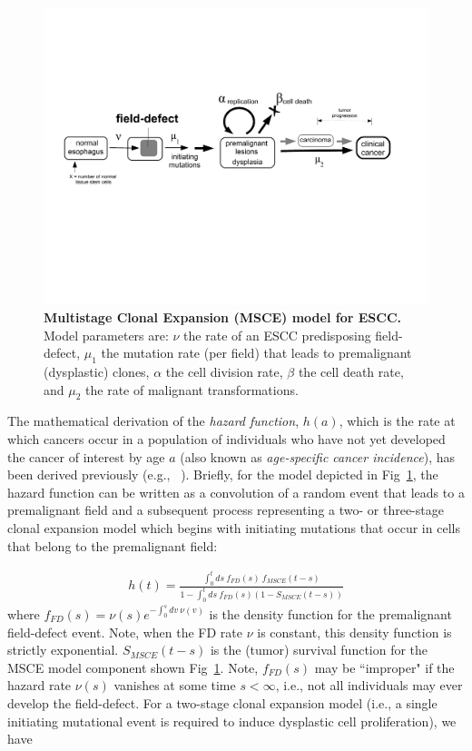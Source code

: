 \documentclass[10pt,letterpaper]{article}
\begin{document}
\medskip
\begin{figure}[!ht]
\begin{adjustwidth}{-1.in}{0in} %
\includegraphics[scale=0.6, trim=0 0 0 0]{FEFF-model-2.pdf}
\caption{{\bf Multistage Clonal Expansion (MSCE) model for ESCC.} Model parameters are: $\nu$ the rate of an ESCC predisposing field-defect, $\mu_1$ the mutation rate (per field) that leads to premalignant (dysplastic) clones, $\alpha$ the cell division rate, $\beta$ the cell death rate, and $\mu_2$ the rate of malignant transformations.}
\label{fig1}
\end{adjustwidth}
\end{figure}

The mathematical derivation of the {\it hazard function}, $h(a)$, which is the rate at which cancers occur in a population of individuals who have not yet developed the cancer of interest by age $a$ (also known as {\it age-specific cancer incidence}), has been derived previously (e.g., ~\cite{Jeon2006}). Briefly, for the model depicted in Fig~\ref{fig1}, the hazard function can be written as a convolution of a random event that leads to a premalignant field and a subsequent process representing a two- or three-stage clonal expansion model which begins with initiating mutations that occur in cells that belong to the premalignant field:

\begin{eqnarray}
\label{eq:hazard}
    h(t) = \frac{\int_0^t ds \ f_{FD}(s)\ f_{MSCE}(t-s)}{1-\int_0^t ds \ f_{FD}(s)(1-S_{MSCE}(t-s))} 
\end{eqnarray}
where $f_{FD}(s) = \nu(s) e^{-\int_0^s dv \ \nu(v)}$ is the density function for the premalignant field-defect event. Note, when the FD rate $\nu$ is constant, this density function is strictly exponential. $S_{MSCE}(t-s)$ is the (tumor) survival function for the MSCE model component shown Fig~\ref{fig1}. Note, $f_{FD}(s)$ may be ``improper" if the hazard rate $\nu(s)$ vanishes at some time $s< \infty$, i.e., not all individuals may ever develop the field-defect. For a two-stage clonal expansion model (i.e., a single initiating mutational event is required to induce dysplastic cell proliferation), we have
\end{document}
